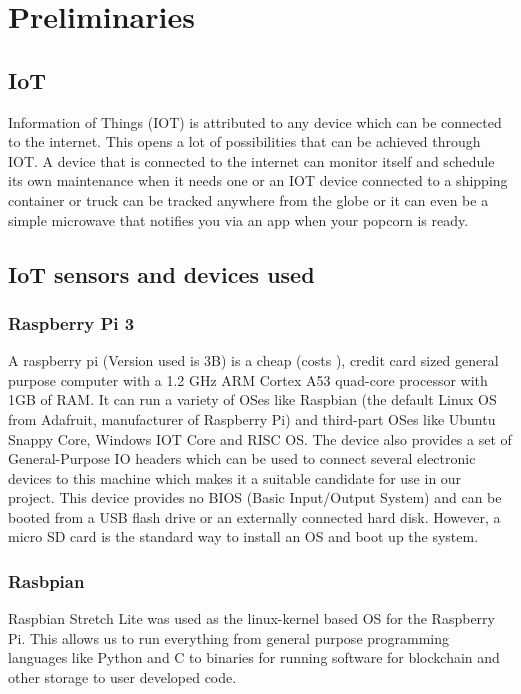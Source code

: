 \documentclass[11pt,openright]{report}
\begin{document}
\section{Preliminaries}\label{section:preliminaries}

\subsection{IoT}
Information of Things (IOT) is attributed to any device which can be connected to the internet. This opens a lot of possibilities that can be achieved through IOT. A device that is connected to the internet can monitor itself and schedule its own maintenance when it needs one or an IOT device connected to a shipping container or truck can be tracked anywhere from the globe or it can even be a simple microwave that notifies you via an app when your popcorn is ready.

\subsection{IoT sensors and devices used}
\subsubsection{Raspberry Pi 3}
A raspberry pi (Version used is 3B) is a cheap (costs ), credit card sized general purpose computer with a 1.2 GHz ARM Cortex A53 quad-core processor with 1GB of RAM. It can run a variety of OSes like Raspbian (the default Linux OS from Adafruit, manufacturer of Raspberry Pi) and third-part OSes like Ubuntu Snappy Core, Windows IOT Core and RISC OS. The device also provides a set of General-Purpose IO headers which can be used to connect several electronic devices to this machine which makes it a suitable candidate for use in our project. This device provides no BIOS (Basic Input/Output System) and can be booted from a USB flash drive or an externally connected hard disk. However, a micro SD card is the standard way to install an OS and boot up the system.  

\subsubsection{Rasbpian}
Raspbian Stretch Lite was used as the linux-kernel based OS for the Raspberry Pi. This allows us to run everything from general purpose programming languages like Python and C to binaries for running software for blockchain and other storage to user developed code.
\end{document}
